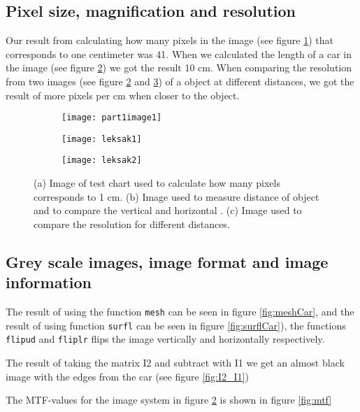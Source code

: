 \subsection{Pixel size, magnification and resolution}
Our result from calculating how many pixels in the image (see figure \ref{fig:TestChart}) that corresponds to one centimeter was 41. When we calculated the length of a car in the image (see figure \ref{fig:Toy1}) we got the result 10 cm. When comparing the resolution from two images (see figure \ref{fig:Toy1} and \ref{fig:Toy2}) of a object at different distances, we got the result of more pixels per cm when closer to the object.

\begin{figure}
	\centering
	\begin{subfigure}[b]{0.3\textwidth}
		\texttt{[image: part1image1]}
		\caption{}
		\label{fig:TestChart}
	\end{subfigure}
	\begin{subfigure}[b]{0.3\textwidth}
		\texttt{[image: leksak1]}
		\caption{}
		\label{fig:Toy1}
	\end{subfigure}
	\begin{subfigure}[b]{0.3\textwidth}
		\texttt{[image: leksak2]}
		\caption{}
		\label{fig:Toy2}
	\end{subfigure}
	\caption{(a) Image of test chart used to calculate how many pixels corresponds to 1 cm. (b) Image used to measure distance of object and to compare the vertical and horizontal . (c) Image used to compare the resolution for different distances.}
	\label{fig:part1}
\end{figure}

\subsection{Grey scale images, image format and image information}
The result of using the function \texttt{mesh} can be seen in figure \ref{fig:meshCar}, and the result of using function \texttt{surfl} can be seen in figure \ref{fig:surflCar}), the functions \texttt{flipud} and \texttt{fliplr} flips the image vertically and horizontally respectively. 

The result of taking the matrix I2 and subtract with I1 we get an almost black image with the edges from the car (see figure \ref{fig:I2_I1})

The MTF-values for the image system in figure \ref{fig:Toy1} is shown in figure \ref{fig:mtf}

